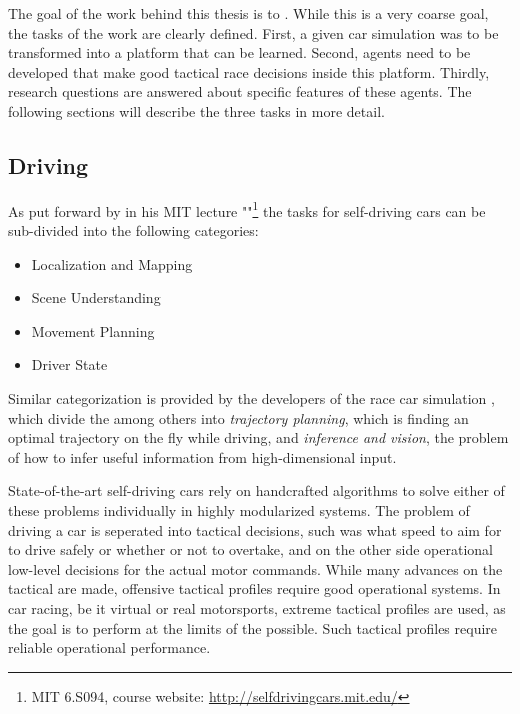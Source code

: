 The goal of the work behind this thesis is to . While this is a very coarse goal, the tasks of the work are clearly defined. First, a given car simulation was to be transformed into a platform that can be learned. Second, agents need to be developed that make good tactical race decisions inside this platform. Thirdly, research questions are answered about specific features of these agents. The following sections will describe the three tasks in more detail.

\subsection{Driving}

As put forward by  in his MIT lecture ""\footnote{MIT 6.S094, course website: \url{http://selfdrivingcars.mit.edu/}} the tasks for self-driving cars can be sub-divided into the following categories: 
\begin{itemize} 
	\item Localization and Mapping
	\item Scene Understanding
	\item Movement Planning
	\item Driver State
\end{itemize}

Similar categorization is provided by the developers of the race car simulation \cite{wymann_torcs_2015}, which divide the  among others into \textit{trajectory planning}, which is finding an optimal trajectory on the fly while driving, and \textit{inference and vision}, the problem of how to infer useful information from high-dimensional input.

State-of-the-art self-driving cars rely on handcrafted algorithms to solve either of these problems individually in highly modularized systems. The problem of driving a car is seperated into tactical decisions, such was what speed to aim for to drive safely or whether or not to overtake, and on the other side operational low-level decisions for the actual motor commands. While many advances on the tactical are made, offensive tactical profiles require good operational systems. In car racing, be it virtual or real motorsports, extreme tactical profiles are used, as the goal is to perform at the limits of the possible. Such tactical profiles require reliable operational performance.

